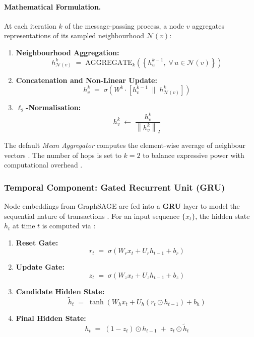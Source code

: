 \documentclass[12pt, a4paper]{article}
\begin{document}
\paragraph{Mathematical Formulation.}
At each iteration $k$ of the message-passing process, a node $v$ aggregates representations of its sampled neighbourhood $\mathcal{N}(v)$:
 
\begin{enumerate}[leftmargin=2.5em, itemsep=8pt]
  \item \textbf{Neighbourhood Aggregation:}
  \[
    h^{k}_{\mathcal{N}(v)} \;=\; \mathrm{AGGREGATE}_k\!\left(\left\{ h^{k-1}_u,\; \forall\, u \in \mathcal{N}(v) \right\}\right)
  \]
 
  \item \textbf{Concatenation and Non-Linear Update:}
  \[
    h^{k}_v \;=\; \sigma\!\left( W^k \cdot \left[ h^{k-1}_v \;\Big\|\; h^{k}_{\mathcal{N}(v)} \right] \right)
  \]
 
  \item \textbf{$\ell_2$-Normalisation:}
  \[
    h^{k}_v \;\leftarrow\; \frac{h^{k}_v}{\left\| h^{k}_v \right\|_2}
  \]
\end{enumerate}
 
The default \textit{Mean Aggregator} computes the element-wise average of neighbour vectors \cite{graphsage2017}. The number of hops is set to $k = 2$ to balance expressive power with computational overhead \cite{graphsage2017}.
 
\subsubsection*{Temporal Component: Gated Recurrent Unit (GRU)}
 
Node embeddings from GraphSAGE are fed into a \textbf{GRU} layer to model the sequential nature of transactions \cite{temporalhgcl2025}. For an input sequence $\{x_t\}$, the hidden state $h_t$ at time $t$ is computed via \cite{gru2014}:
 
\begin{enumerate}[leftmargin=2.5em, itemsep=8pt]
  \item \textbf{Reset Gate:}
  \[
    r_t \;=\; \sigma\!\left( W_r x_t + U_r h_{t-1} + b_r \right)
  \]
 
  \item \textbf{Update Gate:}
  \[
    z_t \;=\; \sigma\!\left( W_z x_t + U_z h_{t-1} + b_z \right)
  \]
 
  \item \textbf{Candidate Hidden State:}
  \[
    \tilde{h}_t \;=\; \tanh\!\left( W_h x_t + U_h (r_t \odot h_{t-1}) + b_h \right)
  \]
 
  \item \textbf{Final Hidden State:}
  \[
    h_t \;=\; (1 - z_t) \odot h_{t-1} \;+\; z_t \odot \tilde{h}_t
  \]
\end{enumerate}
 
\end{document}
